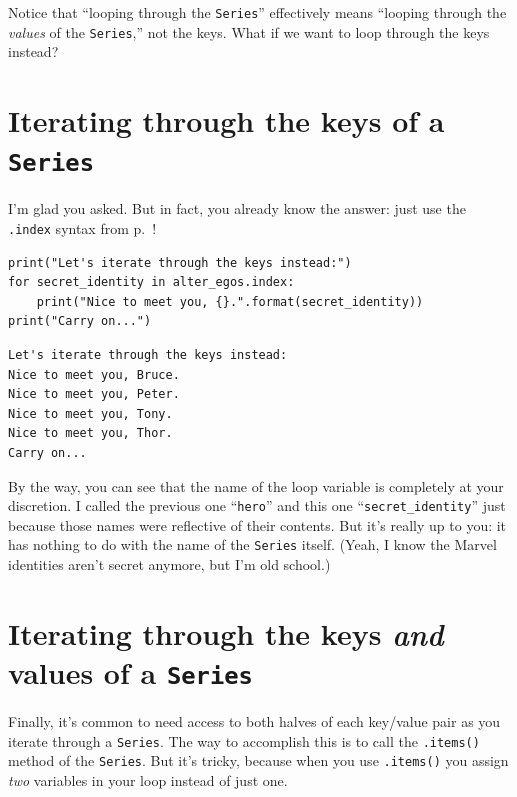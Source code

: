 Notice that ``looping through the \texttt{Series}'' effectively means ``looping
through the \textit{values} of the \texttt{Series},'' not the keys. What if we
want to loop through the keys instead?

\section[\small Iterating through keys of a \texttt{Series}]{Iterating through the keys of a \texttt{Series}}


I'm glad you asked. But in fact, you already know the answer: just use the
\texttt{.index} syntax from p.~\pageref{dotIndex}!

\begin{Verbatim}[fontsize=\small,samepage=true,frame=single,framesep=3mm]
print("Let's iterate through the keys instead:")
for secret_identity in alter_egos.index:
    print("Nice to meet you, {}.".format(secret_identity))
print("Carry on...")
\end{Verbatim}

\begin{Verbatim}[fontsize=\small,samepage=true,frame=leftline,framesep=5mm,framerule=1mm]
Let's iterate through the keys instead:
Nice to meet you, Bruce.
Nice to meet you, Peter.
Nice to meet you, Tony.
Nice to meet you, Thor.
Carry on...
\end{Verbatim}


By the way, you can see that the name of the loop variable is completely at
your discretion. I called the previous one ``\texttt{hero}'' and this one
``\texttt{secret\_identity}'' just because those names were reflective of their
contents. But it's really up to you: it has nothing to do with the name of the
\texttt{Series} itself. (Yeah, I know the Marvel identities aren't secret
anymore, but I'm old school.)

\section[\small Iterating through keys/values of a \texttt{Series}]{Iterating through the keys \textit{and} values of a \texttt{Series}}


Finally, it's common to need access to both halves of each key/value pair as
you iterate through a \texttt{Series}. The way to accomplish this is to call
the \texttt{.items()} method of the \texttt{Series}. But it's tricky, because
when you use \texttt{.items()} you assign \textit{two} variables in your loop
instead of just one.

